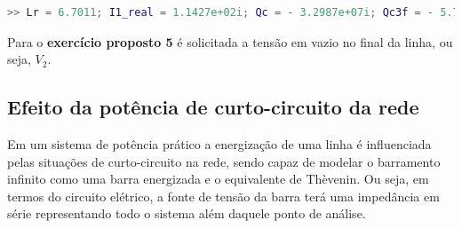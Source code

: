 \begin{lstlisting}[language=Matlab,style=consolestyle]
>> Lr = 6.7011; I1_real = 1.1427e+02i; Qc = - 3.2987e+07i; Qc3f = - 5.7135e+07i;
\end{lstlisting}

Para o \textbf{exercício proposto 5} é solicitada a tensão em vazio no final da linha, ou seja, $V_2$.

\subsection{Efeito da potência de curto-circuito da rede}

Em um sistema de potência prático a energização de uma linha é influenciada pelas situações de curto-circuito na rede, sendo capaz de modelar o barramento infinito como uma barra energizada e o equivalente de Thèvenin. Ou seja, em termos do circuito elétrico, a fonte de tensão da barra terá uma impedância em série representando todo o sistema além daquele ponto de análise.

